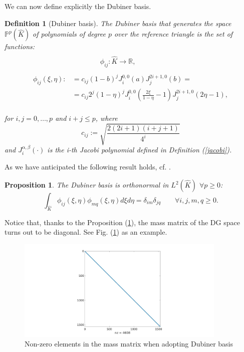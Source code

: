 \documentclass[a4paper,11pt]{article}
\newtheorem{definition}{Definition}
\newtheorem{prop}{Proposition}
\begin{document}
    \noindent We can now define explicitly the Dubiner basis.
    \begin{definition}[Dubiner basis] \label{dubiner}
    The Dubiner basis that generates the space $\mathbb{P}^p(\hat{K})$ of polynomials of degree $p$ over the reference triangle is the set of functions:
    \begin{equation*}
    \begin{split}
    \\
    & \quad \quad\quad  \quad \phi_{ij}: \hat{K} \rightarrow \mathbb{R}, \\ \\
    \phi_{ij}(\xi,\eta) :&= c_{ij}(1-b)^j J_i^{0,0}(a) J_j^{2i+1,0}(b)=
    \\&=c_{ij} 2^j (1-\eta)^j J_i^{0,0}(\frac{2\xi}{1-\eta}-1) J_j^{2i+1,0} (2\eta-1),
    \end{split}
    \end{equation*}
    \vspace{3mm} \\
    for $i,j=0,\dots,p$ and $i+j \le p$, where
    \begin{equation*}
    c_{ij} := \sqrt{\frac{2(2i+1)(i+j+1)}{4^i}}
    \end{equation*}
    and $J_i^{\alpha,\beta}(\cdot)$ is the i-th Jacobi polynomial defined in Definition (\ref{jacobi}).
    \end{definition}
    
    \vspace{5mm}
    \noindent As we have anticipated the following result holds, cf.  \cite{sherwin}.
    \begin{prop}\label{l2_ortho}
    The Dubiner basis is orthonormal in $L^2(\hat{K})$ $\forall p \geq 0$:
    \begin{equation*}
    \int_{\hat{K}}{\phi_{ij}(\xi,\eta)\phi_{mq}(\xi,\eta) d\xi d\eta}=\delta_{im}\delta_{jq} \qquad \forall i,j,m,q \geq 0.
    \end{equation*}
    \end{prop}
    \vspace{4mm}
    \noindent Notice that, thanks to the Proposition (\ref{l2_ortho}), the mass matrix of the DG space turns out to be diagonal. See Fig. (\ref{mass}) as an example.
    
    \begin{figure}[ht]
    \begin{center}
    \includegraphics[width = 10cm]{./mass_dubiner.jpg}
    	\caption{Non-zero elements in the mass matrix when adopting Dubiner basis}
    	\label{mass}
    \end{center}
    \end{figure}
\end{document}
